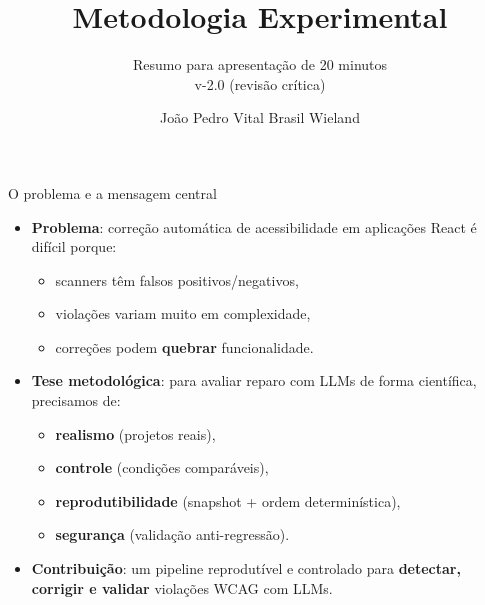 \documentclass[aspectratio=169]{beamer}
\title[Metodologia Experimental]{Metodologia Experimental}
\subtitle{Resumo para apresentação de 20 minutos \\ v-2.0 (revisão crítica)}
\author{João Pedro Vital Brasil Wieland}
\begin{document}
\maketitle

\section{}

\begin{frame}{O problema e a mensagem central}
\small
\begin{itemize}
  \item \textbf{Problema}: correção automática de acessibilidade em aplicações React é difícil porque:
  \begin{itemize}
    \item scanners têm falsos positivos/negativos,
    \item violações variam muito em complexidade,
    \item correções podem \textbf{quebrar} funcionalidade.
  \end{itemize}
  \item \textbf{Tese metodológica}: para avaliar reparo com LLMs de forma científica, precisamos de:
  \begin{itemize}
    \item \textbf{realismo} (projetos reais),
    \item \textbf{controle} (condições comparáveis),
    \item \textbf{reprodutibilidade} (snapshot + ordem determinística),
    \item \textbf{segurança} (validação anti-regressão).
  \end{itemize}
  \item \textbf{Contribuição}: um pipeline reprodutível e controlado para
        \textbf{detectar, corrigir e validar} violações WCAG com LLMs.
\end{itemize}
\end{frame}
\end{document}
